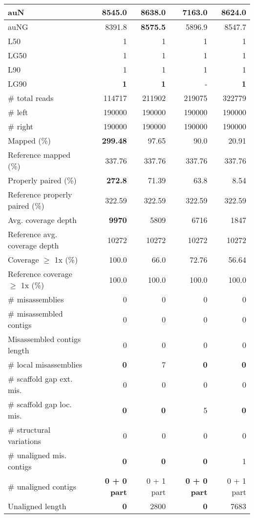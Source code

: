 \documentclass[12pt,a4paper]{article}
\begin{document}
\begin{table}[ht]
\begin{center}
\begin{tabular}{|l*{4}{|r}|}
auN & 8545.0 & {\bf 8638.0} & 7163.0 & 8624.0 \\ \hline
auNG & 8391.8 & {\bf 8575.5} & 5896.9 & 8547.7 \\ \hline
L50 & 1 & 1 & 1 & 1 \\ \hline
LG50 & 1 & 1 & 1 & 1 \\ \hline
L90 & 1 & 1 & 1 & 1 \\ \hline
LG90 & {\bf 1} & {\bf 1} & - & {\bf 1} \\ \hline
\# total reads & 114717 & 211902 & 219075 & 322779 \\ \hline
\# left & 190000 & 190000 & 190000 & 190000 \\ \hline
\# right & 190000 & 190000 & 190000 & 190000 \\ \hline
Mapped (\%) & {\bf 299.48} & 97.65 & 90.0 & 20.91 \\ \hline
Reference mapped (\%) & 337.76 & 337.76 & 337.76 & 337.76 \\ \hline
Properly paired (\%) & {\bf 272.8} & 71.39 & 63.8 & 8.54 \\ \hline
Reference properly paired (\%) & 322.59 & 322.59 & 322.59 & 322.59 \\ \hline
Avg. coverage depth & {\bf 9970} & 5809 & 6716 & 1847 \\ \hline
Reference avg. coverage depth & 10272 & 10272 & 10272 & 10272 \\ \hline
Coverage $\geq$ 1x (\%) & 100.0 & 66.0 & 72.76 & 56.64 \\ \hline
Reference coverage $\geq$ 1x (\%) & 100.0 & 100.0 & 100.0 & 100.0 \\ \hline
\# misassemblies & 0 & 0 & 0 & 0 \\ \hline
\# misassembled contigs & 0 & 0 & 0 & 0 \\ \hline
Misassembled contigs length & 0 & 0 & 0 & 0 \\ \hline
\# local misassemblies & {\bf 0} & 7 & {\bf 0} & {\bf 0} \\ \hline
\# scaffold gap ext. mis. & 0 & 0 & 0 & 0 \\ \hline
\# scaffold gap loc. mis. & {\bf 0} & {\bf 0} & 5 & {\bf 0} \\ \hline
\# structural variations & 0 & 0 & 0 & 0 \\ \hline
\# unaligned mis. contigs & {\bf 0} & {\bf 0} & {\bf 0} & 1 \\ \hline
\# unaligned contigs & {\bf 0 + 0 part} & 0 + 1 part & {\bf 0 + 0 part} & 0 + 1 part \\ \hline
Unaligned length & {\bf 0} & 2800 & {\bf 0} & 7683 \\ \hline

\end{tabular}
\end{center}
\end{table}
\end{document}
